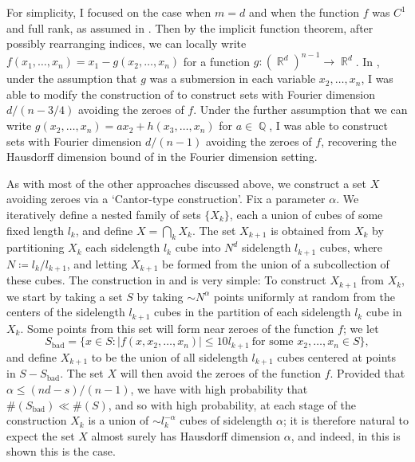 \documentclass[11pt]{article}
\DeclareMathOperator{\QQ}{\mathbb{Q}}
\DeclareMathOperator{\RR}{\mathbb{R}}
\begin{document}
For simplicity, I focused on the case when $m = d$ and when the function $f$ was $C^1$ and full rank, as assumed in \cite{FraserPramanik}. Then by the implicit function theorem, after possibly rearranging indices, we can locally write $f(x_1,\dots,x_n) = x_1 - g(x_2,\dots,x_n)$ for a function $g: (\RR^d)^{n-1} \to \RR^d$. In \cite{DensonFourier}, under the assumption that $g$ was a submersion in each variable $x_2,\dots,x_n$, I was able to modify the construction of \cite{FraserPramanik} to construct sets with Fourier dimension $d/(n-3/4)$ avoiding the zeroes of $f$. Under the further assumption that we can write $g(x_2,\dots,x_n) = ax_2 + h(x_3,\dots,x_n)$ for $a \in \QQ$, I was able to construct sets with Fourier dimension $d/(n-1)$ avoiding the zeroes of $f$, recovering the Hausdorff dimension bound of \cite{FraserPramanik} in the Fourier dimension setting.

As with most of the other approaches discussed above, we construct a set $X$ avoiding zeroes via a `Cantor-type construction'. Fix a parameter $\alpha$. We iteratively define a nested family of sets $\{ X_k \}$, each a union of cubes of some fixed length $l_k$, and define $X = \bigcap_k X_k$. The set $X_{k+1}$ is obtained from $X_k$ by partitioning $X_k$ each sidelength $l_k$ cube into $N^d$ sidelength $l_{k+1}$ cubes, where $N \coloneqq l_k / l_{k+1}$, and letting $X_{k+1}$ be formed from the union of a subcollection of these cubes. The construction in \cite{DensonPramanikZahl} and \cite{DensonFourier} is very simple: To construct $X_{k+1}$ from $X_k$, we start by taking a set $S$ by taking $\sim N^\alpha$ points uniformly at random from the centers of the sidelength $l_{k+1}$ cubes in the partition of each sidelength $l_k$ cube in $X_k$. Some points from this set will form near zeroes of the function $f$; we let
%
\[ S_{\text{bad}} = \{ x \in S : |f(x,x_2,\dots,x_n)| \leq 10 l_{k+1}\ \text{for some $x_2,\dots,x_n \in S$} \}, \]
%
and define $X_{k+1}$ to be the union of all sidelength $l_{k+1}$ cubes centered at points in $S - S_{\text{bad}}$. The set $X$ will then avoid the zeroes of the function $f$. Provided that $\alpha \leq (nd - s)/(n-1)$, we have with high probability that $\#(S_{\text{bad}}) \ll \#(S)$, and so with high probability, at each stage of the construction $X_k$ is a union of $\sim l_k^{-\alpha}$ cubes of sidelength $\alpha$; it is therefore natural to expect the set $X$ almost surely has Hausdorff dimension $\alpha$, and indeed, in \cite{DensonPramanikZahl} this is shown this is the case.
\end{document}

